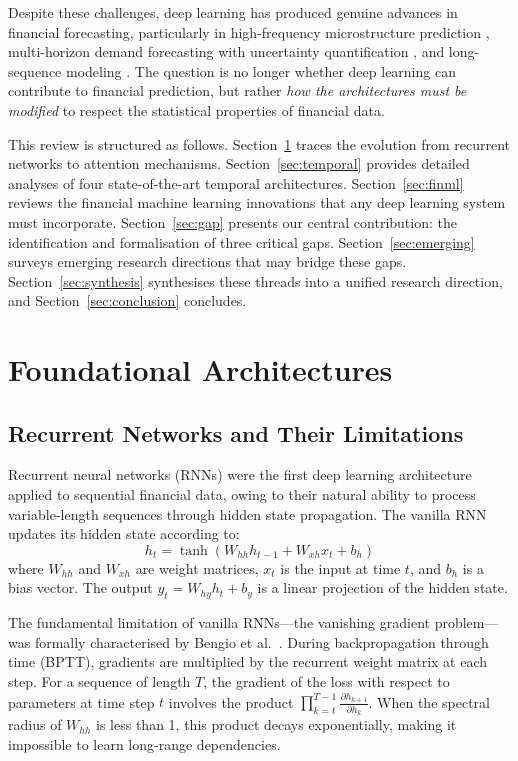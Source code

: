 \documentclass[conference]{IEEEtran}
\begin{document}
Despite these challenges, deep learning has produced genuine advances in financial forecasting, particularly in high-frequency microstructure prediction \cite{zhang2019deeplob}, multi-horizon demand forecasting with uncertainty quantification \cite{lim2021temporal}, and long-sequence modeling \cite{zhou2021informer}. The question is no longer whether deep learning can contribute to financial prediction, but rather \emph{how the architectures must be modified} to respect the statistical properties of financial data.

This review is structured as follows. Section~\ref{sec:foundations} traces the evolution from recurrent networks to attention mechanisms. Section~\ref{sec:temporal} provides detailed analyses of four state-of-the-art temporal architectures. Section~\ref{sec:finml} reviews the financial machine learning innovations that any deep learning system must incorporate. Section~\ref{sec:gap} presents our central contribution: the identification and formalisation of three critical gaps. Section~\ref{sec:emerging} surveys emerging research directions that may bridge these gaps. Section~\ref{sec:synthesis} synthesises these threads into a unified research direction, and Section~\ref{sec:conclusion} concludes.

\section{Foundational Architectures}
\label{sec:foundations}

\subsection{Recurrent Networks and Their Limitations}

Recurrent neural networks (RNNs) were the first deep learning architecture applied to sequential financial data, owing to their natural ability to process variable-length sequences through hidden state propagation. The vanilla RNN updates its hidden state according to:
\begin{equation}
h_t = \tanh(W_{hh} h_{t-1} + W_{xh} x_t + b_h)
\end{equation}
where $W_{hh}$ and $W_{xh}$ are weight matrices, $x_t$ is the input at time $t$, and $b_h$ is a bias vector. The output $y_t = W_{hy} h_t + b_y$ is a linear projection of the hidden state.

The fundamental limitation of vanilla RNNs---the vanishing gradient problem---was formally characterised by Bengio et al.\ \cite{bengio1994learning}. During backpropagation through time (BPTT), gradients are multiplied by the recurrent weight matrix at each step. For a sequence of length $T$, the gradient of the loss with respect to parameters at time step $t$ involves the product $\prod_{k=t}^{T-1} \frac{\partial h_{k+1}}{\partial h_k}$. When the spectral radius of $W_{hh}$ is less than 1, this product decays exponentially, making it impossible to learn long-range dependencies.
\end{document}
